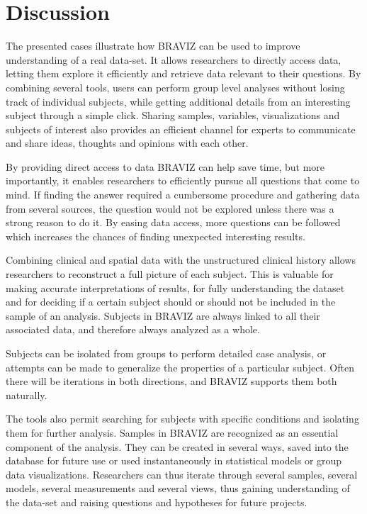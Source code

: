 \documentclass[twocolumn]{svjour3}
\begin{document}
\section{Discussion}
\label{sec:disc}

The presented cases illustrate how BRAVIZ can be used to improve understanding of a real data-set. 
It allows researchers to directly access data, letting them explore it efficiently and retrieve data relevant to their questions. By combining several tools, users can perform group level analyses without losing track of individual subjects, while getting additional details from an interesting subject through a simple click. Sharing samples, variables, visualizations and subjects of interest also provides an efficient channel for experts to communicate and share ideas, thoughts and opinions with each other.

By providing direct access to data BRAVIZ can help save time, but more importantly, it enables researchers to efficiently pursue all questions that come to mind. If finding the answer required a cumbersome procedure and gathering data from several sources, the question would not be explored unless there was a strong reason to do it. By easing data access, more questions can be followed which increases the chances of finding unexpected interesting results.

Combining clinical and spatial data with the unstructured clinical history allows researchers to reconstruct a full picture of each subject. This is valuable for making accurate interpretations of results, for fully understanding the dataset and for deciding if a certain subject should or should not be included in the sample of an analysis. Subjects in BRAVIZ are always linked to all their associated data, and therefore always  analyzed as a whole.

Subjects can be isolated from groups to perform detailed case analysis, or attempts can be made to generalize the properties of a particular subject. Often there will be iterations in both directions, and BRAVIZ supports them both naturally.

The tools also permit searching for subjects with specific conditions and isolating them for further analysis.
Samples in BRAVIZ are recognized as an essential component of the analysis. They can be created in several ways, saved into the database for future use or used instantaneously in statistical models or group data visualizations. Researchers can thus iterate through several samples, several models, several measurements and several views, thus gaining understanding of the data-set and raising questions and hypotheses for future projects.
\end{document}
